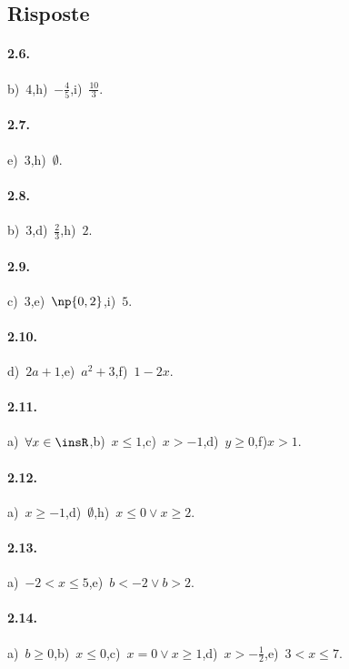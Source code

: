 \subsection{Risposte}

\paragraph{2.6.}
b)~$4$,\quad h)~$-\frac{4}{5}$,\quad i)~$\frac{10}{3}$.

\paragraph{2.7.}
e)~$3$,\quad h)~$\emptyset$.

\paragraph{2.8.}
b)~$3$,\quad d)~$\frac{2}{3}$,\quad h)~$2$.

\paragraph{2.9.}
c)~$3$,\quad e)~$\np{0,2}$,\quad i)~$5$.

\paragraph{2.10.}
d)~$2a+1$,\quad e)~$a^2+3$,\quad f)~$1-2x$.

\paragraph{2.11.}
a)~$\forall x\in \insR$,\quad b)~$x\le 1$,\quad c)~$x>-1$,\quad d)~$y\ge 0$,\quad f)$x>1$.

\paragraph{2.12.}
a)~$x\ge -1$,\quad d)~$\emptyset$,\quad h)~$x\le 0 \vee x\ge 2$.

\paragraph{2.13.}
a)~$-2<x\le 5$,\quad e)~$b<-2\vee b>2$.

\paragraph{2.14.}
a)~$b\ge 0$,\quad b)~$x\le 0$,\quad c)~$x=0\vee x\ge 1$,\quad d)~$x>-\frac{1}{2}$,\quad e)~$3<x\le 7$.

